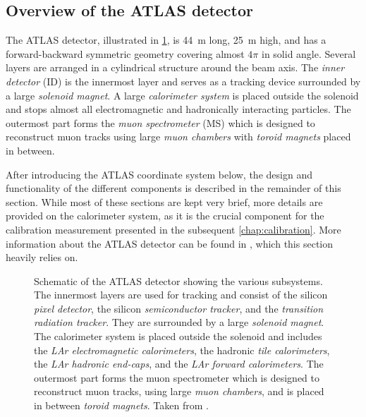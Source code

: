\subsection{Overview of the ATLAS detector}
The ATLAS detector, illustrated in \cref{fig:ATLASlayout}, is \SI{44}{\meter} long, \SI{25}{\meter} high, and has a forward-backward symmetric geometry covering almost $4\pi$ in solid angle.
Several layers are arranged in a cylindrical structure around the beam axis.
The \emph{inner detector} (ID) is the innermost layer and serves as a tracking device surrounded by a large \emph{solenoid magnet}.
A large \emph{calorimeter system} is placed outside the solenoid and stops almost all electromagnetic and hadronically interacting particles.
The outermost part forms the \emph{muon spectrometer} (MS) which is designed to reconstruct muon tracks using large \emph{muon chambers} with \emph{toroid magnets} placed in between.

After introducing the ATLAS coordinate system below, the design and functionality of the different components is described in the remainder of this section.
While most of these sections are kept very brief, more details are provided on the calorimeter system, as it is the crucial component for the calibration measurement presented in the subsequent \cref{chap:calibration}.
More information about the ATLAS detector can be found in , which this section heavily relies on.


\begin{figure}
    \caption[Schematic of the ATLAS detector showing the various subsystems.]{Schematic of the ATLAS detector showing the various subsystems.
        The innermost layers are used for tracking and consist of the silicon \emph{pixel detector}, the silicon \emph{semiconductor tracker}, and the \emph{transition radiation tracker}.
        They are surrounded by a large \emph{solenoid magnet}.
        The calorimeter system is placed outside the solenoid and includes the \emph{LAr electromagnetic calorimeters}, the hadronic \emph{tile calorimeters}, the \emph{LAr hadronic end-caps}, and the \emph{LAr forward calorimeters}.
        The outermost part forms the muon spectrometer which is designed to reconstruct muon tracks, using large \emph{muon chambers}, and is placed in between \emph{toroid magnets}. Taken from .}
    \label{fig:ATLASlayout}
\end{figure}


